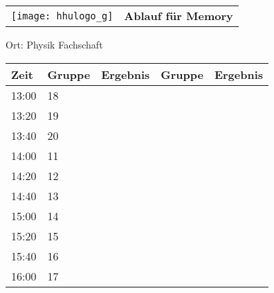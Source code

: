 \documentclass[a4paper,10pt]{article}
\def\spielh{Memory}
\def\raumhh{Physik Fachschaft}
\begin{document}
   \newpage
  \begin{tabularx}{\textwidth}{lc}
    \texttt{[image: hhulogo\_g]}
  & {\Huge \textbf{Ablauf für \spielh}}
  \end{tabularx}
  \LARGE
  \begin{center}
    \vspace{1cm} 
    Ort: \raumhh
  \end{center}
    \vspace{2cm} 
    \begin{tabularx}{\textwidth}{X||X|X||X|X}
	\textbf{Zeit} &\textbf{Gruppe} & \textbf{Ergebnis} &\textbf{Gruppe} & \textbf{Ergebnis}  	\\ \hline \hline
	13:00 &	18	&	&	&	\\ \hline
	13:20 &	19	&	&	&	\\ \hline
	13:40 &	20	&	&	&	\\ \hline

	14:00 &	11	&	&	&	\\ \hline
	14:20 &	12	&	&	&	\\ \hline
	14:40 &	13	&	&	&	\\ \hline

	15:00 &	14	&	&	&	\\ \hline
	15:20 &	15	&	&	&	\\ \hline
	15:40 &	16	&	&	&	\\ \hline

	16:00 &	17	&	&	&	\\ \hline
      
    \end{tabularx}
   
\end{document}
